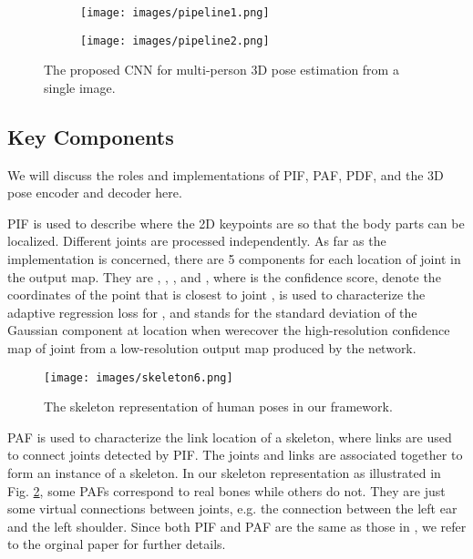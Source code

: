 \documentclass{article}
\begin{document}
\begin{figure}[h]
\centering
\begin{subfigure}[b]{0.8\textwidth}
\texttt{[image: images/pipeline1.png]}
\end{subfigure}
\begin{subfigure}[b]{0.8\textwidth}
\texttt{[image: images/pipeline2.png]}
\end{subfigure}
\caption{The proposed CNN for multi-person 3D pose estimation 
from a single image.}\label{fig:network}
\end{figure}


\subsection{Key Components}

We will discuss the roles and implementations of PIF, PAF, PDF, and the
3D pose encoder and decoder here. 

PIF is used to describe where the 2D keypoints are so that the body
parts can be localized. Different joints are processed independently.
As far as the implementation is concerned, there are 5 components for
each location of joint  in the output map. They are , , ,
 and , where  is the confidence score,  denote
the coordinates of the point that is closest to joint ,  is used
to characterize the adaptive regression loss for , and
 stands for the standard deviation of the Gaussian component at
location  when werecover the high-resolution confidence map
of joint  from a low-resolution output map produced by the network. 

\begin{figure}[h]
\centering
\texttt{[image: images/skeleton6.png]}
\caption{The skeleton representation of human poses in our framework.}
\label{fig:skeleton}
\end{figure}


PAF is used to characterize the link location of a skeleton, where links
are used to connect joints detected by PIF. The joints and links are
associated together to form an instance of a skeleton. In our skeleton
representation as illustrated in Fig. \ref{fig:skeleton}, some PAFs
correspond to real bones while others do not. They are just some virtual
connections between joints, e.g. the connection between the left ear and
the left shoulder. Since both PIF and PAF are the same as those in
\cite{kreiss2019pifpaf}, we refer to the orginal paper for further
details. 
\end{document}
